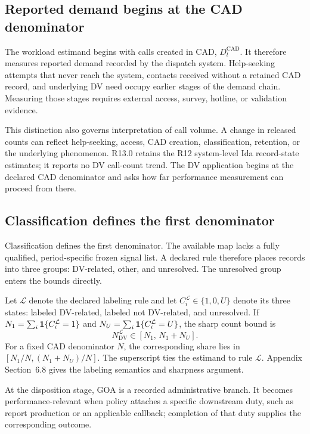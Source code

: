 \documentclass[11pt]{article}
\begin{document}
\subsection{Reported demand begins at the CAD denominator}

The workload estimand begins with calls created in CAD, $D_t^{\mathrm{CAD}}$. It therefore measures reported demand recorded by the dispatch system. Help-seeking attempts that never reach the system, contacts received without a retained CAD record, and underlying DV need occupy earlier stages of the demand chain. Measuring those stages requires external access, survey, hotline, or validation evidence.

This distinction also governs interpretation of call volume. A change in released counts can reflect help-seeking, access, CAD creation, classification, retention, or the underlying phenomenon. R13.0 retains the R12 system-level Ida record-state estimates; it reports no DV call-count trend. The DV application begins at the declared CAD denominator and asks how far performance measurement can proceed from there.

\subsection{Classification defines the first denominator}

Classification defines the first denominator. The available map lacks a fully qualified, period-specific frozen signal list. A declared rule therefore places records into three groups: DV-related, other, and unresolved. The unresolved group enters the bounds directly.

Let $\mathcal L$ denote the declared labeling rule and let $C_i^{\mathcal L}\in\{1,0,U\}$ denote its three states: labeled DV-related, labeled not DV-related, and unresolved. If $N_1=\sum_i\mathbf{1}\{C_i^{\mathcal L}=1\}$ and $N_U=\sum_i\mathbf{1}\{C_i^{\mathcal L}=U\}$, the sharp count bound is
\begin{equation}
N_{\mathrm{DV}}^{\mathcal L}\in[N_1,\,N_1+N_U].
\label{eq:dv_bounds}
\end{equation}
For a fixed CAD denominator $N$, the corresponding share lies in $[N_1/N,(N_1+N_U)/N]$. The superscript ties the estimand to rule $\mathcal L$. Appendix Section~6.8 gives the labeling semantics and sharpness argument.

At the disposition stage, GOA is a recorded administrative branch. It becomes performance-relevant when policy attaches a specific downstream duty, such as report production or an applicable callback; completion of that duty supplies the corresponding outcome.
\end{document}
